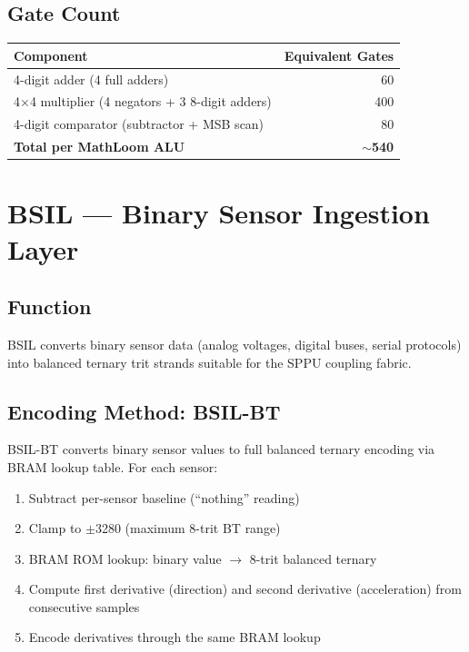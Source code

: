\documentclass[11pt, a4paper]{article}
\begin{document}
\subsection{Gate Count}

\begin{center}
\begin{tabular}{@{}lr@{}}
\toprule
\textbf{Component} & \textbf{Equivalent Gates} \\
\midrule
4-digit adder (4 full adders) & 60 \\
4$\times$4 multiplier (4 negators + 3 8-digit adders) & 400 \\
4-digit comparator (subtractor + MSB scan) & 80 \\
\midrule
\textbf{Total per MathLoom ALU} & \textbf{$\sim$540} \\
\bottomrule
\end{tabular}
\end{center}

\section{BSIL — Binary Sensor Ingestion Layer}

\subsection{Function}

BSIL converts binary sensor data (analog voltages, digital buses,
serial protocols) into balanced ternary trit strands suitable for
the SPPU coupling fabric.

\subsection{Encoding Method: BSIL-BT}

BSIL-BT converts binary sensor values to full balanced ternary
encoding via BRAM lookup table. For each sensor:

\begin{enumerate}[nosep]
  \item Subtract per-sensor baseline (``nothing'' reading)
  \item Clamp to $\pm$3280 (maximum 8-trit BT range)
  \item BRAM ROM lookup: binary value $\rightarrow$ 8-trit balanced ternary
  \item Compute first derivative (direction) and second derivative
        (acceleration) from consecutive samples
  \item Encode derivatives through the same BRAM lookup
\end{enumerate}
\end{document}

